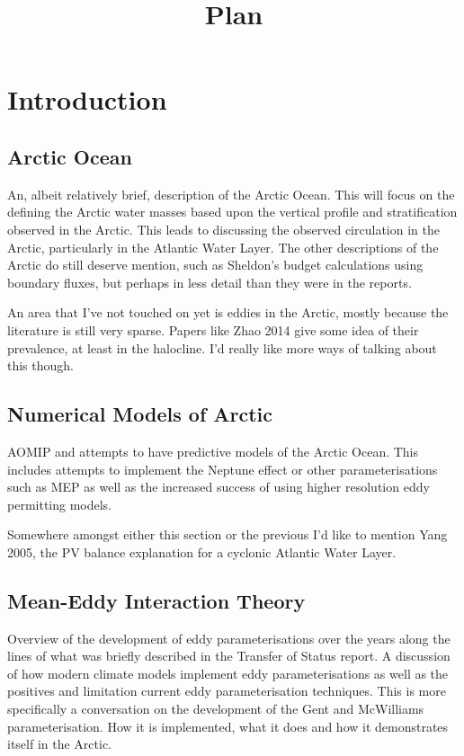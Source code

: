 \documentclass[10pt,a4paper]{article}
\title{Plan}
\begin{document}
\maketitle


\section{Introduction}

\subsection{Arctic Ocean}

An, albeit relatively brief, description of the Arctic Ocean. This will focus on 
the defining the Arctic water masses based upon the vertical profile and stratification
observed in the Arctic. This leads to discussing the observed circulation in the Arctic,
particularly in the Atlantic Water Layer. The other descriptions of the Arctic do still deserve
mention, such as Sheldon's budget calculations using boundary fluxes, but perhaps in less detail
than they were in the reports.

An area that I've not touched on yet is eddies in the Arctic, mostly because the literature
is still very sparse. Papers like Zhao 2014 give some idea of their prevalence, at least in the
halocline. I'd really like more ways of talking about this though.

\subsection{Numerical Models of Arctic}

AOMIP and attempts to have predictive models of the Arctic Ocean. This includes attempts
to implement the Neptune effect or other parameterisations such as MEP as well as
the increased success of using higher resolution eddy permitting models.

Somewhere amongst either this section or the previous I'd like to mention Yang 2005, the 
PV balance explanation for a cyclonic Atlantic Water Layer.

\subsection{Mean-Eddy Interaction Theory}

Overview of the development of eddy parameterisations over the years along
the lines of what was briefly described in the Transfer of Status report. 
A discussion of how
modern climate models implement eddy parameterisations
as well as the positives and limitation current 
eddy parameterisation techniques. 
This is more specifically a conversation on the development
of the Gent and McWilliams parameterisation. 
How it is implemented, what it does and how it demonstrates itself in the Arctic.
\end{document}
